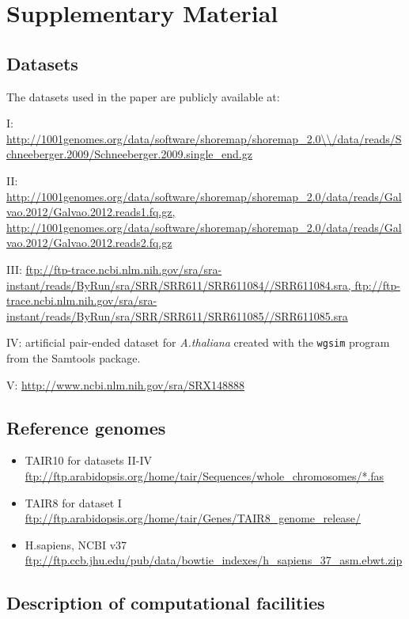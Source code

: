 \documentclass[10pt]{article}
\begin{document}
\section*{Supplementary Material}

\subsection*{Datasets}

The datasets used in the paper are publicly available at:

I: \url{http://1001genomes.org/data/software/shoremap/shoremap\_2.0\\/data/reads/Schneeberger.2009/Schneeberger.2009.single\_end.gz}

II: \url{http://1001genomes.org/data/software/shoremap/shoremap\_2.0/data/reads/Galvao.2012/Galvao.2012.reads1.fq.gz, http://1001genomes.org/data/software/shoremap/shoremap\_2.0/data/reads/Galvao.2012/Galvao.2012.reads2.fq.gz}	

III: \url{ftp://ftp-trace.ncbi.nlm.nih.gov/sra/sra-instant/reads/ByRun/sra/SRR/SRR611/SRR611084//SRR611084.sra, ftp://ftp-trace.ncbi.nlm.nih.gov/sra/sra-instant/reads/ByRun/sra/SRR/SRR611/SRR611085//SRR611085.sra}

IV: artificial pair-ended dataset for {\it A.thaliana} created with the {\tt wgsim} program from the Samtools package.

V: \url{http://www.ncbi.nlm.nih.gov/sra/SRX148888}


\subsection*{Reference genomes}
\begin{itemize}
\item TAIR10 for datasets II-IV \url{ftp://ftp.arabidopsis.org/home/tair/Sequences/whole\_chromosomes/*.fas}
\item TAIR8 for dataset I \url{ftp://ftp.arabidopsis.org/home/tair/Genes/TAIR8\_genome\_release/}
\item H.sapiens, NCBI v37 \url{ftp://ftp.ccb.jhu.edu/pub/data/bowtie\_indexes/h\_sapiens\_37\_asm.ebwt.zip}
\end{itemize}

\subsection*{Description of computational facilities}
\end{document}
